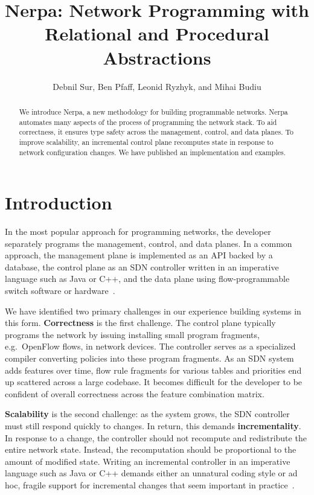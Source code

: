 \documentclass[sigconf, nonacm]{acmart}
\title[Nerpa]{Nerpa: Network Programming with Relational and Procedural Abstractions}
\author{Debnil Sur, Ben Pfaff, Leonid Ryzhyk, and Mihai Budiu}
\affiliation{\institution{VMware} \country{} \city{}}
\begin{document}
\begin{abstract}
We introduce Nerpa, a new methodology for building programmable networks. Nerpa automates many aspects of the process of programming the network stack. To aid correctness, it ensures type safety across the management, control, and data planes. To improve scalability, an incremental control plane recomputes state in response to network configuration changes. We have published an implementation and examples.
\end{abstract}

\maketitle

\section{Introduction}
In the most popular approach for programming networks, the developer separately programs the management, control, and data planes. In a common approach, the management plane is implemented as an API backed by a database, the control plane as an SDN controller written in an imperative language such as Java or C++, and the data plane using flow-programmable switch software or hardware~\cite{casado-sigcomm07, gude-ccr08, koponen-osdi10, berde-hotsdn14, koponen-nsdi14, ovn-austin, NSX}.

We have identified two primary challenges in our experience building systems in this form.
\textbf{Correctness} is the first challenge. The control plane typically programs the network by issuing installing small program fragments, e.g.~OpenFlow flows, in network devices. The controller serves as a specialized compiler converting policies into these program fragments. As an SDN system adds features over time, flow rule fragments for various tables and priorities end up scattered across a large codebase. It becomes difficult for the developer to be confident of overall correctness across the feature combination matrix.

\textbf{Scalability} is the second challenge: as the system grows, the SDN controller must still respond quickly to changes. In return, this demands \textbf{incrementality}. In response to a change, the controller should not recompute and redistribute the entire network state. Instead, the recomputation should be proportional to the amount of modified state. Writing an incremental controller in an imperative language such as Java or C++ demands either an unnatural coding style or ad hoc, fragile support for incremental changes that seem important in practice~\cite{ovn-incremental, moats16}.
\end{document}
